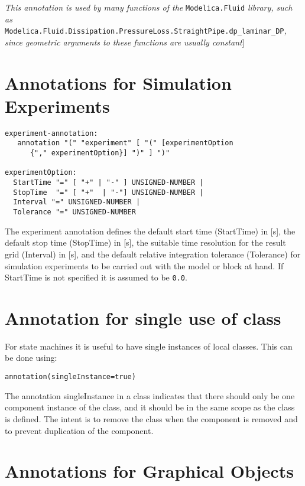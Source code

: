 \emph{This annotation is used by many functions of the} \lstinline!Modelica.Fluid!
\emph{library, such as}\\
\lstinline!Modelica.Fluid.Dissipation.PressureLoss.StraightPipe.dp_laminar_DP!\emph{,
since geometric arguments to these functions are usually constant}{]}

\section{Annotations for Simulation Experiments}
\begin{lstlisting}[language=grammar]
experiment-annotation:
   annotation "(" "experiment" [ "(" [experimentOption
      {"," experimentOption}] ")" ] ")"

experimentOption:
  StartTime "=" [ "+" | "-" ] UNSIGNED-NUMBER |
  StopTime  "=" [ "+"  | "-"] UNSIGNED-NUMBER |
  Interval "=" UNSIGNED-NUMBER |
  Tolerance "=" UNSIGNED-NUMBER
\end{lstlisting}

The experiment annotation defines the default start time (StartTime) in
  {[}s{]}, the default stop time (StopTime) in {[}s{]}, the suitable time
  resolution for the result grid (Interval) in {[}s{]}, and the default
relative integration tolerance (Tolerance) for simulation experiments to
be carried out with the model or block at hand. If StartTime is not specified it is assumed to be \lstinline!0.0!.

\section{Annotation for single use of class}

For state machines it is useful to have single instances of local
classes. This can be done using:
\begin{lstlisting}[language=modelica]
annotation(singleInstance=true)
\end{lstlisting}

The annotation singleInstance in a class indicates that there should
only be one component instance of the class, and it should be in the
same scope as the class is defined. The intent is to remove the class
when the component is removed and to prevent duplication of the
component.

\section{Annotations for Graphical Objects}

